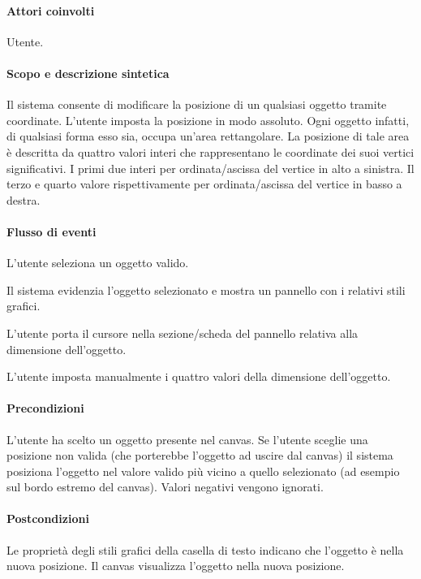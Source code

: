 \paragraph{Attori coinvolti} Utente.
\paragraph{Scopo e descrizione sintetica}   Il sistema consente di modificare la posizione di un qualsiasi oggetto tramite coordinate.  L'utente  imposta la posizione in modo assoluto. Ogni oggetto infatti, di qualsiasi forma esso sia, occupa un'area rettangolare. La posizione di tale area \`e descritta da quattro valori interi che rappresentano le coordinate dei suoi vertici significativi. I primi due interi per ordinata/ascissa del vertice in alto a sinistra. Il terzo e quarto valore rispettivamente per ordinata/ascissa del vertice in basso a destra.
\paragraph{Flusso di eventi}
\begin{elenconumerato}[\textbf{}]{\subsubsecindent}
\item  L'utente seleziona un oggetto valido.
\item  Il sistema evidenzia l'oggetto selezionato e mostra un pannello con i relativi stili grafici.
\item  L'utente porta  il cursore nella sezione/scheda del pannello relativa alla dimensione dell'oggetto.
\item  L'utente imposta manualmente i quattro valori della dimensione dell'oggetto.
\end{elenconumerato}
\paragraph{Precondizioni} L'utente ha scelto un oggetto  presente nel canvas. Se l'utente sceglie una posizione non valida (che porterebbe l'oggetto ad uscire dal canvas) il sistema posiziona l'oggetto nel valore valido pi\` u vicino a quello selezionato (ad esempio sul bordo estremo del canvas). Valori negativi vengono ignorati.
\paragraph{Postcondizioni} Le propriet\`  a degli stili grafici della casella di testo indicano che l'oggetto \`e nella nuova posizione. Il canvas visualizza l'oggetto nella nuova posizione.

